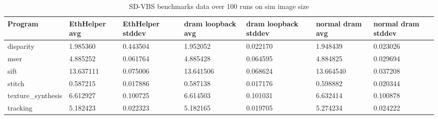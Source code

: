 
\begin{table}[]
    \centering
    {\small
    \begin{tabularx}{\textwidth}{|l|X|X|X|X|X|X|}
    \hline
    \textbf{Program} & \textbf{EthHelper  avg} & \textbf{EthHelper  stddev} & \textbf{dram loopback  avg} & \textbf{dram loopback  stddev} & \textbf{normal  dram  avg} & \textbf{normal  dram  stddev} \\ \hline
    disparity & 1.985360 & 0.443504 & 1.952052 & 0.022170 & 1.948439 & 0.023026 \\ \hline
    mser & 4.885252 & 0.061764 & 4.885428 & 0.064595 & 4.884825 & 0.029694 \\ \hline
    sift & 13.637111 & 0.075006 & 13.641506 & 0.068624 & 13.664540 & 0.037208 \\ \hline
    stitch & 0.587215 & 0.017886 & 0.587138 & 0.017176 & 0.598882 & 0.020344 \\ \hline
    texture\_synthesis & 6.612927 & 0.100725 & 6.614503 & 0.101031 & 6.632414 & 0.100878 \\ \hline
    tracking & 5.182423 & 0.022323 & 5.182165 & 0.019705 & 5.274234 & 0.024222 \\ \hline
    \end{tabularx}
    }
    \caption{SD-VBS benchmarks data over 100 runs on sim image size}
    \label{tab:sdvbs_sim_image}
    \end{table}